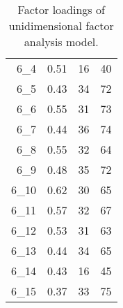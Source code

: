 \begin{table}[ht]
\begin{tabular}{rrrr}
  6\_4 & 0.51 & 16 & 40 \\ 
  6\_5 & 0.43 & 34 & 72 \\ 
  6\_6 & 0.55 & 31 & 73 \\ 
  6\_7 & 0.44 & 36 & 74 \\ 
  6\_8 & 0.55 & 32 & 64 \\ 
  6\_9 & 0.48 & 35 & 72 \\ 
  6\_10 & 0.62 & 30 & 65 \\ 
  6\_11 & 0.57 & 32 & 67 \\ 
  6\_12 & 0.53 & 31 & 63 \\ 
  6\_13 & 0.44 & 34 & 65 \\ 
  6\_14 & 0.43 & 16 & 45 \\ 
  6\_15 & 0.37 & 33 & 75 \\ 
   \bottomrule
\end{tabular}
\endgroup
\caption{Factor loadings of unidimensional factor analysis model.} 
\label{tab:fa1}
\end{table}
